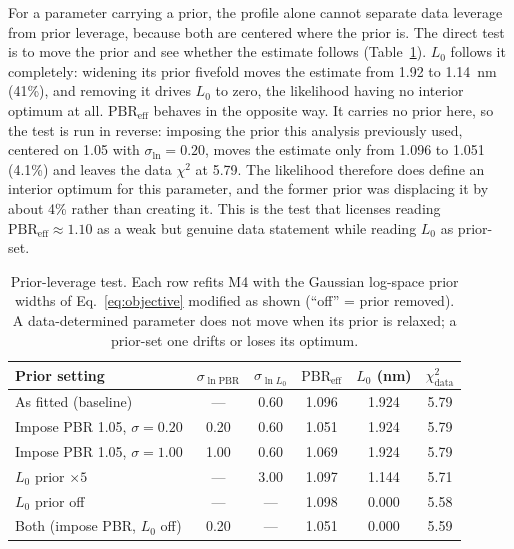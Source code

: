 \documentclass[pdflatex,sn-nature]{sn-jnl}
\begin{document}
For a parameter carrying a prior, the profile alone cannot separate data
leverage from prior leverage, because both are centered where the prior
is. The direct test is to move the prior and see whether the estimate
follows (Table~\ref{tab:priortest}). $L_0$ follows it completely:
widening its prior fivefold moves the estimate from 1.92 to 1.14~nm
(41\%), and removing it drives $L_0$ to zero, the likelihood having no
interior optimum at all. $\mathrm{PBR}_\text{eff}$ behaves in the
opposite way. It carries no prior here, so the test is run in reverse:
imposing the prior this analysis previously used, centered on 1.05 with
$\sigma_{\ln} = 0.20$, moves the estimate only from 1.096 to 1.051
(4.1\%) and leaves the data $\chi^2$ at 5.79. The likelihood therefore
does define an interior optimum for this parameter, and the former prior
was displacing it by about 4\% rather than creating it. This is the test
that licenses reading $\mathrm{PBR}_\text{eff} \approx 1.10$ as a weak
but genuine data statement while reading $L_0$ as prior-set.

\begin{table}[htbp]
\centering
\caption{Prior-leverage test. Each row refits M4 with the Gaussian
log-space prior widths of Eq.~\eqref{eq:objective} modified as shown
(``off'' = prior removed). A data-determined parameter does not move when
its prior is relaxed; a prior-set one drifts or loses its optimum.}
\label{tab:priortest}
\begin{tabular}{lccccc}
\toprule
Prior setting & $\sigma_{\ln \mathrm{PBR}}$ & $\sigma_{\ln L_0}$ & $\mathrm{PBR}_\text{eff}$ & $L_0$ (nm) & $\chi^2_\text{data}$ \\
\midrule
As fitted (baseline) & --- & 0.60 & 1.096 & 1.924 & 5.79 \\
Impose PBR 1.05, $\sigma=0.20$ & 0.20 & 0.60 & 1.051 & 1.924 & 5.79 \\
Impose PBR 1.05, $\sigma=1.00$ & 1.00 & 0.60 & 1.069 & 1.924 & 5.79 \\
$L_0$ prior $\times5$ & --- & 3.00 & 1.097 & 1.144 & 5.71 \\
$L_0$ prior off & --- & --- & 1.098 & 0.000 & 5.58 \\
Both (impose PBR, $L_0$ off) & 0.20 & --- & 1.051 & 0.000 & 5.59 \\
\bottomrule
\end{tabular}
\end{table}
\end{document}
